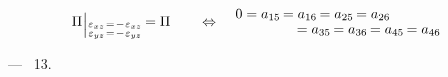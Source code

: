 \noindent
\begin{equation}\label{zeroconstants:oneplaneofsymmetry}
\potentialenergydensity \hspace{.1ex}
\raisemath{-0.2em} {
    \Bigr\vert
}_{\substack{
    \infinitesimaldeformationcomponents{xz} \hspace{.2ex} = \hspace{.2ex} -\infinitesimaldeformationcomponents{xz} \\
    \infinitesimaldeformationcomponents{yz} \hspace{.2ex} = \hspace{.2ex} -\infinitesimaldeformationcomponents{yz}
}
} \hspace{-0.2ex}
=
\potentialenergydensity
\hspace{2em} \Leftrightarrow \hspace{-3em}
\begin{array}{c}
   0 =
   a_{15} \hspace{-0.2ex}
   = a_{16} \hspace{-0.2ex}
   = a_{25} \hspace{-0.2ex}
   = a_{26}
\\ [-0.1em]
\hspace{8em}
   = a_{35} \hspace{-0.2ex}
   = a_{36} \hspace{-0.2ex}
   = a_{45} \hspace{-0.2ex}
   = a_{46}
\end{array}
\vspace{.1em}\end{equation}

\noindent
---
~13.

